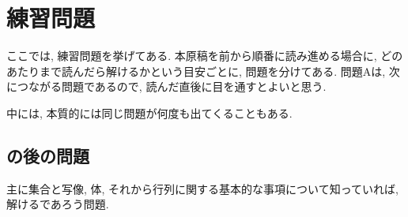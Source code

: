 
\chapter{練習問題}

ここでは,
練習問題を挙げてある.
本原稿を前から順番に読み進める場合に,
どのあたりまで読んだら解けるかという目安ごとに,
問題を分けてある.
問題Aは, 次につながる問題であるので,
読んだ直後に目を通すとよいと思う.

中には, 本質的には同じ問題が何度も出てくることもある.

\section{の後の問題}
主に集合と写像, 体, それから行列に関する基本的な事項について知っていれば,
解けるであろう問題.
